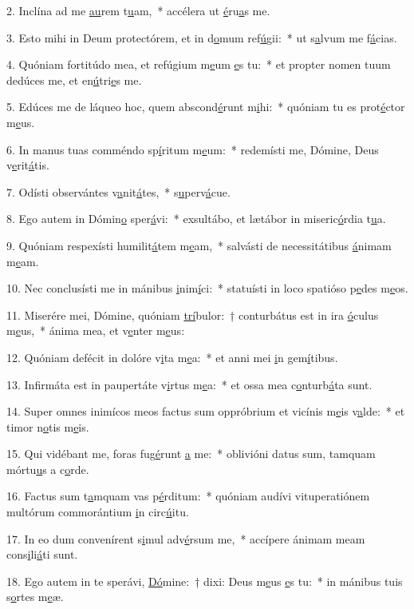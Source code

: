2. Inclína ad me \uline{au}rem t\uline{u}am,~* accélera ut \uline{é}ru\uline{a}s me.\par 
3. Esto mihi in Deum protectórem, et in d\uline{o}mum ref\uline{ú}gii:~* ut s\uline{a}lvum me f\uline{á}cias.\par 
4. Quóniam fortitúdo mea, et refúgium m\uline{e}um \uline{e}s tu:~* et propter nomen tuum dedúces me, et en\uline{ú}tri\uline{e}s me.\par 
5. Edúces me de láqueo hoc, quem abscond\uline{é}runt m\uline{i}hi:~* quóniam tu es prot\uline{é}ctor m\uline{e}us.\par 
6. In manus tuas comméndo sp\uline{í}ritum m\uline{e}um:~* redemísti me, Dómine, Deus v\uline{e}rit\uline{á}tis.\par 
7. Odísti observántes v\uline{a}nit\uline{á}tes,~* s\uline{u}perv\uline{á}cue.\par 
8. Ego autem in Dómin\uline{o} sper\uline{á}vi:~* exsultábo, et lætábor in miseric\uline{ó}rdia t\uline{u}a.\par 
9. Quóniam respexísti humilit\uline{á}tem m\uline{e}am,~* salvásti de necessitátibus \uline{á}nimam m\uline{e}am.\par 
10. Nec conclusísti me in mánibus \uline{i}nim\uline{í}ci:~* statuísti in loco spatióso p\uline{e}des m\uline{e}os.\par 
11. Miserére mei, Dómine, quóniam \uline{trí}bulor:~† conturbátus est in ira \uline{ó}culus m\uline{e}us,~* ánima mea, et v\uline{e}nter m\uline{e}us:\par 
12. Quóniam defécit in dolóre v\uline{i}ta m\uline{e}a:~* et anni mei \uline{i}n gem\uline{í}tibus.\par 
13. Infirmáta est in paupertáte v\uline{i}rtus m\uline{e}a:~* et ossa mea c\uline{o}nturb\uline{á}ta sunt.\par 
14. Super omnes inimícos meos factus sum oppróbrium et vicínis m\uline{e}is v\uline{a}lde:~* et timor n\uline{o}tis m\uline{e}is.\par 
15. Qui vidébant me, foras fug\uline{é}runt \uline{a} me:~* oblivióni datus sum, tamquam mórtu\uline{u}s a c\uline{o}rde.\par 
16. Factus sum t\uline{a}mquam vas p\uline{é}rditum:~* quóniam audívi vituperatiónem multórum commorántium \uline{i}n circ\uline{ú}itu.\par 
17. In eo dum convenírent s\uline{i}mul adv\uline{é}rsum me,~* accípere ánimam meam cons\uline{i}li\uline{á}ti sunt.\par 
18. Ego autem in te sperávi, \uline{Dó}mine:~† dixi: Deus m\uline{e}us \uline{e}s tu:~* in mánibus tuis s\uline{o}rtes m\uline{e}æ.\par 
